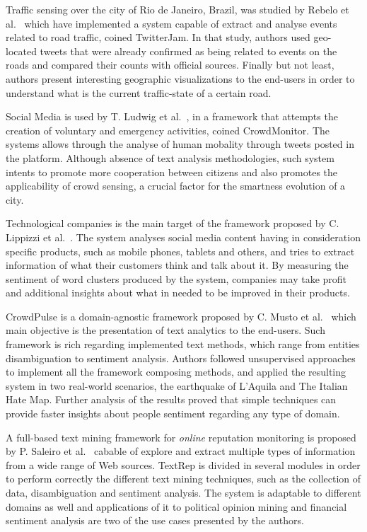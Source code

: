 Traffic sensing over the city of Rio de Janeiro, Brazil, was studied by Rebelo et al.~\cite{rebelo2015twitterjam} which have implemented a system capable of extract and analyse events related to road traffic, coined  TwitterJam. In that study, authors used geo-located tweets that were already confirmed as being related to events on the roads and compared their counts with official sources. Finally but not least, authors present interesting geographic visualizations to the end-users in order to understand what is the current traffic-state of a certain road.

Social Media is used by T. Ludwig et al.~\cite{kn:Ludwig2015}, in a framework that attempts the creation of voluntary and emergency activities, coined CrowdMonitor. The systems allows through the analyse of human mobality through tweets posted in the platform. Although absence of text analysis methodologies, such system intents to promote more cooperation between citizens and also promotes the applicability of crowd sensing, a crucial factor for the smartness evolution of a city.

Technological companies is the main target of the framework proposed by C. Lippizzi et al.~\cite{kn:Lipizzi2015}. The system analyses social media content having in consideration specific products, such as mobile phones, tablets and others, and tries to extract information of what their customers think and talk about it. By measuring the sentiment of word clusters produced by the system, companies may take profit and additional insights about what in needed to be improved in their products.

CrowdPulse is a domain-agnostic framework proposed by C. Musto et al.~\cite{kn:Musto2015} which main objective is the presentation of text analytics to the end-users. Such framework is rich regarding implemented text methods, which range from entities disambiguation to sentiment analysis. Authors followed unsupervised approaches to implement all the framework composing methods, and applied the resulting system in two real-world scenarios, the earthquake of L'Aquila and The Italian Hate Map. Further analysis of the results proved that simple techniques can provide faster insights about people sentiment regarding any type of domain.

A full-based text mining framework for \textit{online} reputation monitoring is proposed by P. Saleiro et al.~\cite{saleiro2017texrep} cabable of explore and extract multiple types of information from a wide range of Web sources. TextRep is divided in several modules in order to perform correctly the different text mining techniques, such as the collection of data, disambiguation and sentiment analysis. The system is adaptable to different domains as well and applications of it to political opinion mining and financial sentiment analysis are two of the use cases presented by the authors.

